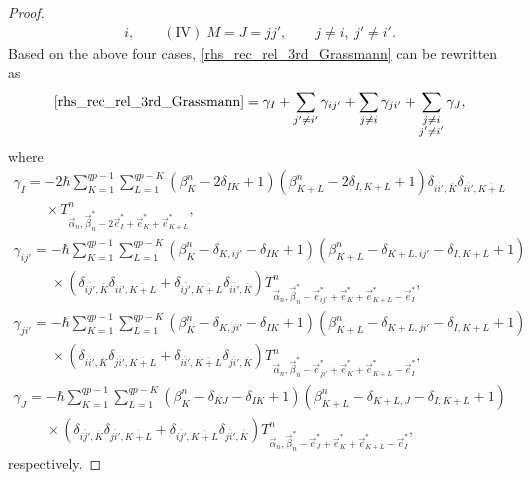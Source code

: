 \documentclass[pdftex]{sigma}
\numberwithin{equation}{section}
\begin{document}
\begin{proof}
\begin{gather*}
 i,
 \qquad
 (\textrm{IV}) \
 M=J=jj',
\qquad
 j
 \neq
 i, \
 j'
 \neq
 i'
 .
\end{gather*}
Based on the above four cases, \eqref{rhs_rec_rel_3rd_Grassmann} can be rewritten as
\begin{align*}
\eqref{rhs_rec_rel_3rd_Grassmann}
=
\gamma_{I}
+
\sum_{
j'
\neq
i'
}
\gamma_{ij'}
+
\sum_{
j
\neq
i
}
\gamma_{ji'}
+
\sum_{
\substack{
j
\neq
i
\\
j'
\neq
i'
}
}
\gamma_{J},
\end{align*}
where
\begin{gather*}
\gamma_{I}
=
 -
 2
 \hbar
 \sum_{K=1}^{qp-1}
 \sum_{L=1}^{qp-K}
 (
 \beta_{K}^{n}
 -
 2
 \delta_{IK}
 +
 1
 )
 (
 \beta_{K+L}^{n}
 -
 2
 \delta_{I,K+L}
 +
 1
 )
 \delta_{
 \overline{ii'},
 \overline{K}
 }
 \delta_{
 \overline{ii'},
 \overline{K+L}
 }\\
 \phantom{\gamma_{I}
=}{}
 \times T^{n}_{\vec{\alpha}_{n},\vec{\beta}_{n}^{\ast}-2\vec{e}_{I}^{\ast}+\vec{e}_{K}^{\ast}+\vec{e}_{K+L}^{\ast}},
\\
\gamma_{ij'}
=
 -
 \hbar
 \sum_{K=1}^{qp-1}
 \sum_{L=1}^{qp-K}
 (
 \beta_{K}^{n}
 -
 \delta_{K,ij'}
 -
 \delta_{IK}
 +
 1
 )
 (
 \beta_{K+L}^{n}
 -
 \delta_{K+L,ij'}
 -
 \delta_{I,K+L}
 +
 1
 )
 \\
\phantom{\gamma_{ij'}
=}{}
 \times
 (
 \delta_{
 \overline{ij'},
 \overline{K}
 }
 \delta_{
 \overline{ii'},
 \overline{K+L}
 }
 +
 \delta_{
 \overline{ij'},
 \overline{K+L}
 }
 \delta_{
 \overline{ii'},
 \overline{K}
 }
 )
 T^{n}_{\vec{\alpha}_{n},\vec{\beta}_{n}^{\ast}-\vec{e}_{ij'}^{\ast}
 +\vec{e}_{K}^{\ast}+\vec{e}_{K+L}^{\ast}-\vec{e}_{I}^{\ast}},
\\
\gamma_{ji'}
=
-
 \hbar
 \sum_{K=1}^{qp-1}
 \sum_{L=1}^{qp-K}
 (
 \beta_{K}^{n}
 -
 \delta_{K,ji'}
 -
 \delta_{IK}
 +
 1
 )
 (
 \beta_{K+L}^{n}
 -
 \delta_{K+L,ji'}
 -
 \delta_{I,K+L}
 +
 1
 )
 \\
\phantom{\gamma_{ji'}
=}{}
 \times
 (
 \delta_{
 \overline{ii'},
 \overline{K}
 }
 \delta_{
 \overline{ji'},
 \overline{K+L}
 }
 +
 \delta_{
 \overline{ii'},
 \overline{K+L}
 }
 \delta_{
 \overline{ji'},
 \overline{K}
 }
 )
 T^{n}_{\vec{\alpha}_{n},\vec{\beta}_{n}^{\ast}-\vec{e}_{ji'}^{\ast}+\vec{e}_{K}^{\ast}
 +\vec{e}_{K+L}^{\ast}-\vec{e}_{I}^{\ast}},
\\
\gamma_{J}
=
-
 \hbar
 \sum_{K=1}^{qp-1}
 \sum_{L=1}^{qp-K}
 (
 \beta_{K}^{n}
 -
 \delta_{KJ}
 -
 \delta_{IK}
 +
 1
 )
 (
 \beta_{K+L}^{n}
 -
 \delta_{K+L,J}
 -
 \delta_{I,K+L}
 +
 1
 ) \\
\phantom{\gamma_{J}
=}{}
 \times
 (
 \delta_{
 \overline{ij'},
 \overline{K}
 }
 \delta_{
 \overline{ji'},
 \overline{K+L}
 }
 +
 \delta_{
 \overline{ij'},
 \overline{K+L}
 }
 \delta_{
 \overline{ji'},
 \overline{K}
 }
 )
 T^{n}_{\vec{\alpha}_{n},\vec{\beta}_{n}^{\ast}-\vec{e}_{J}^{\ast}
 +\vec{e}_{K}^{\ast}+\vec{e}_{K+L}^{\ast}-\vec{e}_{I}^{\ast}},
\end{gather*}
respectively.


\end{proof}
\end{document}
